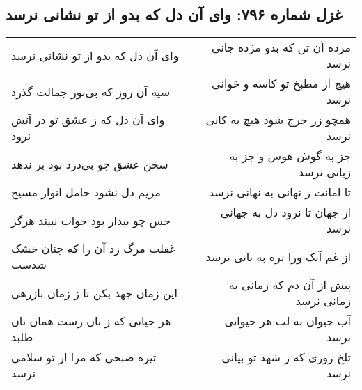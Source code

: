 \begin{center}
\section*{غزل شماره ۷۹۶: وای آن دل که بدو از تو نشانی نرسد}
\label{sec:0796}
\begin{longtable}{l p{0.5cm} r}
وای آن دل که بدو از تو نشانی نرسد
&&
مرده آن تن که بدو مژده جانی نرسد
\\
سیه آن روز که بی‌نور جمالت گذرد
&&
هیچ از مطبخ تو کاسه و خوانی نرسد
\\
وای آن دل که ز عشق تو در آتش نرود
&&
همچو زر خرج شود هیچ به کانی نرسد
\\
سخن عشق چو بی‌درد بود بر ندهد
&&
جز به گوش هوس و جز به زبانی نرسد
\\
مریم دل نشود حامل انوار مسیح
&&
تا امانت ز نهانی به نهانی نرسد
\\
حس چو بیدار بود خواب نبیند هرگز
&&
از جهان تا نرود دل به جهانی نرسد
\\
غفلت مرگ زد آن را که چنان خشک شدست
&&
از غم آنک ورا تره به نانی نرسد
\\
این زمان جهد بکن تا ز زمان بازرهی
&&
پیش از آن دم که زمانی به زمانی نرسد
\\
هر حیاتی که ز نان رست همان نان طلبد
&&
آب حیوان به لب هر حیوانی نرسد
\\
تیره صبحی که مرا از تو سلامی نرسد
&&
تلخ روزی که ز شهد تو بیانی نرسد
\\
\end{longtable}
\end{center}
